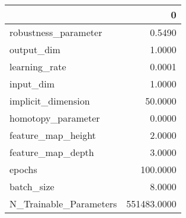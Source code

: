 \begin{tabular}{lr}
\toprule
{} &            0 \\
\midrule
robustness\_parameter   &       0.5490 \\
output\_dim             &       1.0000 \\
learning\_rate          &       0.0001 \\
input\_dim              &       1.0000 \\
implicit\_dimension     &      50.0000 \\
homotopy\_parameter     &       0.0000 \\
feature\_map\_height     &       2.0000 \\
feature\_map\_depth      &       3.0000 \\
epochs                 &     100.0000 \\
batch\_size             &       8.0000 \\
N\_Trainable\_Parameters &  551483.0000 \\
\bottomrule
\end{tabular}
